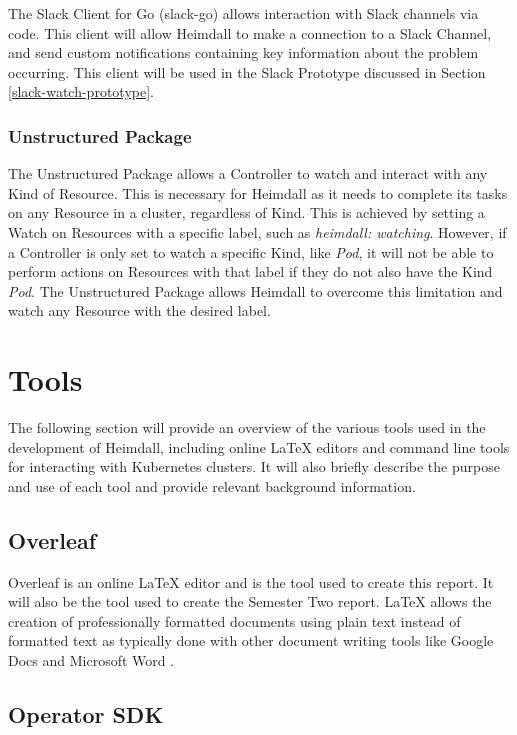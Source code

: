 \documentclass{article}
\begin{document}
The Slack Client for Go (slack-go) allows interaction with Slack channels via code. This client will allow Heimdall to make a connection to a Slack Channel, and send custom notifications containing key information about the problem occurring. This client will be used in the Slack Prototype discussed in Section \ref{slack-watch-prototype}.

\subsubsection{Unstructured Package}

The Unstructured Package allows a Controller to watch and interact with any Kind of Resource. This is necessary for Heimdall as it needs to complete its tasks on any Resource in a cluster, regardless of Kind. This is achieved by setting a Watch on Resources with a specific label, such as \emph{heimdall: watching}. However, if a Controller is only set to watch a specific Kind, like \emph{Pod}, it will not be able to perform actions on Resources with that label if they do not also have the Kind \emph{Pod}. The Unstructured Package allows Heimdall to overcome this limitation and watch any Resource with the desired label.

\section{Tools}

The following section will provide an overview of the various tools used in the development of Heimdall, including online LaTeX editors and command line tools for interacting with Kubernetes clusters. It will also briefly describe the purpose and use of each tool and provide relevant background information.

\subsection{Overleaf}

Overleaf is an online LaTeX editor and is the tool used to create this report. It will also be the tool used to create the Semester Two report. LaTeX allows the creation of professionally formatted documents using plain text instead of formatted text as typically done with other document writing tools like Google Docs and Microsoft Word \cite{overleaf}.


\subsection{Operator SDK} \label{osdk}
\end{document}
